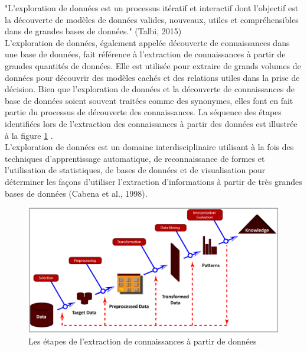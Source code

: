     "L'exploration de données est un processus itératif et interactif dont l'objectif est la découverte de modèles de données valides,
    nouveaux, utiles et compréhensibles dans de grandes bases de données." (Talbi, 2015) \\
    L'exploration de données, également appelée découverte de connaissances dans une base de données,
    fait référence à l'extraction de connaissances à partir de grandes quantités de données. Elle est
    utilisée pour extraire de grands volumes de données pour découvrir des modèles cachés et des 
    relations utiles dans la prise de décision. Bien que l'exploration de données et la découverte 
    de connaissances de base de données soient souvent traitées comme des synonymes, elles font en 
    fait partie du processus de découverte des connaissances. La séquence des étapes identifiées lors
    de l'extraction des connaissances à partir des données est illustrée à la figure \ref{extraction_connaissances} \cite{data_mining_concepts_techniques}.  \\
    L'exploration de données est un domaine interdisciplinaire utilisant à la fois des techniques 
    d'apprentissage automatique, de reconnaissance de formes et l'utilisation de statistiques, de bases de 
    données et de visualisation pour déterminer les façons d'utiliser l'extraction d'informations à partir de 
    très grandes bases de données (Cabena et al., 1998).

    \begin{figure}[H]
		\begin{center}
			\includegraphics[width=\textwidth]{images/chapitre1/extract_data_steps.png}
		\end{center}
    \caption{Les étapes de l'extraction de connaissances à partir de données}
    \label{extraction_connaissances}
    \end{figure}
    
